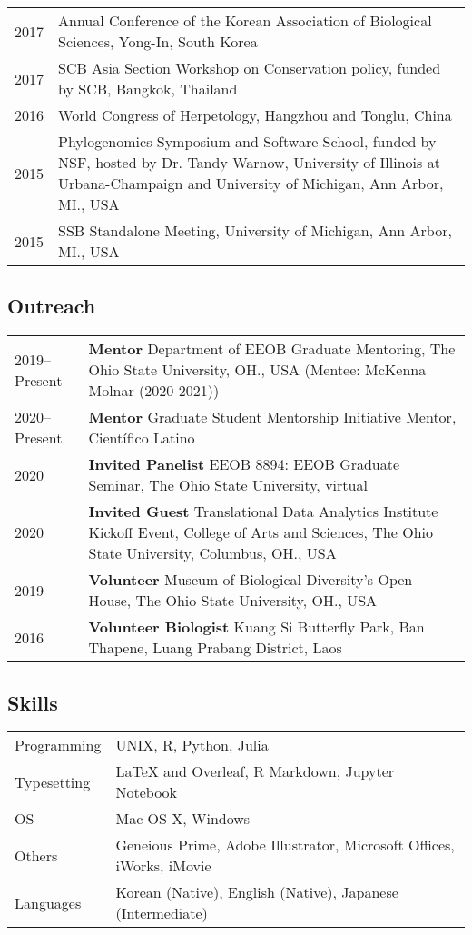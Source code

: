 \documentclass[11pt]{article}
\begin{document}
\begin{longtable}{p{}  p{}}
2017 & Annual Conference of the Korean Association of Biological Sciences, Yong-In, South Korea\\
2017 & SCB Asia Section Workshop on Conservation policy, funded by SCB, Bangkok, Thailand\\
2016 & World Congress of Herpetology, Hangzhou and Tonglu, China\\
2015 & Phylogenomics Symposium and Software School, funded by NSF, hosted by Dr. Tandy Warnow, University of Illinois at Urbana-Champaign and University of Michigan, Ann Arbor, MI., USA\\
2015 & SSB Standalone Meeting, University of Michigan, Ann Arbor, MI., USA\vspace{10pt}\\
\end{longtable}


\subsection*{Outreach}
\begin{longtable}{p{}  p{}}
2019--Present & \textbf{Mentor} Department of EEOB Graduate Mentoring, The Ohio State University, OH., USA (Mentee: McKenna Molnar (2020-2021))\\
2020--Present& \textbf{Mentor} Graduate Student Mentorship Initiative Mentor, Científico Latino\\
2020 &	\textbf{Invited Panelist} EEOB 8894: EEOB Graduate Seminar, The Ohio State University, virtual\\
2020 &	\textbf{Invited Guest} Translational Data Analytics Institute Kickoff Event, College of Arts and Sciences, The Ohio State University, Columbus, OH., USA\\
2019 & \textbf{Volunteer} Museum of Biological Diversity’s Open House, The Ohio State University, OH., USA\\
2016 &  \textbf{Volunteer Biologist} Kuang Si Butterfly Park, Ban Thapene, Luang Prabang District, Laos\vspace{10pt}\\
\end{longtable}


\subsection*{Skills}
\begin{longtable}{p{}  p{}}
Programming & UNIX, R, Python, Julia\\
Typesetting &  {\LaTeX} and Overleaf, R Markdown, Jupyter Notebook\\
OS & Mac OS X, Windows\\
Others & Geneious Prime, Adobe Illustrator, Microsoft Offices, iWorks, iMovie\\
Languages & Korean (Native), English (Native), Japanese (Intermediate)\vspace{10pt}\\
\end{longtable}
\end{document}
